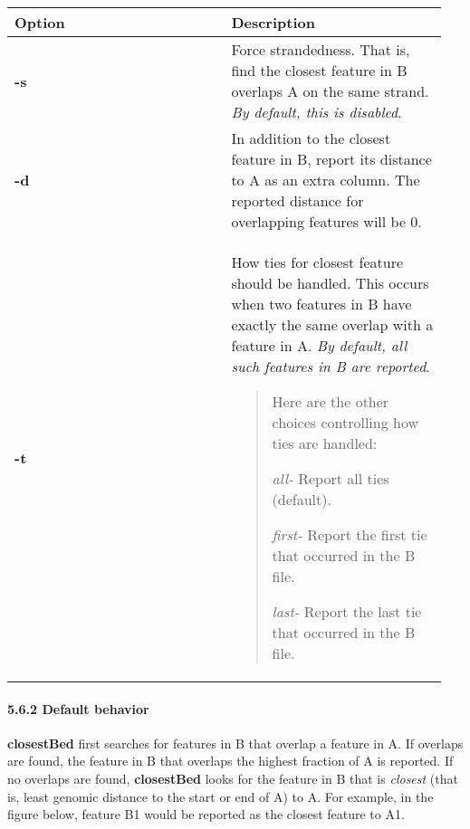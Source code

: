 \documentclass[letterpaper,10pt,english]{sphinxmanual}
\begin{document}
\begin{tabular}{|p{0.475\linewidth}|p{0.475\linewidth}|}
\hline
\textbf{
Option
} & \textbf{
Description
}\\\hline

\textbf{-s}
 & 
Force strandedness. That is, find the closest feature in B overlaps A on the same strand. \emph{By default, this is disabled}.
\\\hline

\textbf{-d}
 & 
In addition to the closest feature in B, report its distance to A as an extra column. The reported distance for overlapping features will be 0.
\\\hline

\textbf{-t}
 & 
How ties for closest feature should be handled. This occurs when two features in B have exactly the same overlap with a feature in A. \emph{By default, all such features in B are reported}.
\begin{quote}

Here are the other choices controlling how ties are handled:

\emph{all-}   Report all ties (default).

\emph{first-}   Report the first tie that occurred in the B file.

\emph{last-}   Report the last tie that occurred in the B file.
\end{quote}
\\\hline
\end{tabular}



\paragraph{5.6.2 Default behavior}
\label{content/closestBed:default-behavior}
\textbf{closestBed} first searches for features in B that overlap a feature in A. If overlaps are found, the feature
in B that overlaps the highest fraction of A is reported. If no overlaps are found, \textbf{closestBed} looks for
the feature in B that is \emph{closest} (that is, least genomic distance to the start or end of A) to A. For
example, in the figure below, feature B1 would be reported as the closest feature to A1.
\end{document}
